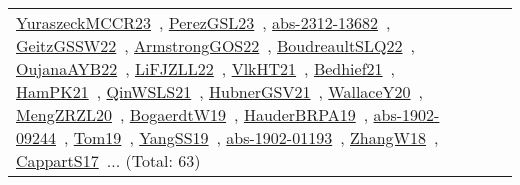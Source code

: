 {\begin{longtable}{lp{3cm}>{\raggedright\arraybackslash}p{6cm}>{\raggedright\arraybackslash}p{6cm}>{\raggedright\arraybackslash}p{8cm}}
\href{articles/YuraszeckMCCR23.pdf}{YuraszeckMCCR23}~\cite{YuraszeckMCCR23}, \href{papers/PerezGSL23.pdf}{PerezGSL23}~\cite{PerezGSL23}, \href{articles/abs-2312-13682.pdf}{abs-2312-13682}~\cite{abs-2312-13682}, \href{papers/GeitzGSSW22.pdf}{GeitzGSSW22}~\cite{GeitzGSSW22}, \href{papers/ArmstrongGOS22.pdf}{ArmstrongGOS22}~\cite{ArmstrongGOS22}, \href{papers/BoudreaultSLQ22.pdf}{BoudreaultSLQ22}~\cite{BoudreaultSLQ22}, \href{papers/OujanaAYB22.pdf}{OujanaAYB22}~\cite{OujanaAYB22}, \href{papers/LiFJZLL22.pdf}{LiFJZLL22}~\cite{LiFJZLL22}, \href{articles/VlkHT21.pdf}{VlkHT21}~\cite{VlkHT21}, \href{articles/Bedhief21.pdf}{Bedhief21}~\cite{Bedhief21}, \href{articles/HamPK21.pdf}{HamPK21}~\cite{HamPK21}, \href{articles/QinWSLS21.pdf}{QinWSLS21}~\cite{QinWSLS21}, \href{articles/HubnerGSV21.pdf}{HubnerGSV21}~\cite{HubnerGSV21}, \href{articles/WallaceY20.pdf}{WallaceY20}~\cite{WallaceY20}, \href{articles/MengZRZL20.pdf}{MengZRZL20}~\cite{MengZRZL20}, \href{papers/BogaerdtW19.pdf}{BogaerdtW19}~\cite{BogaerdtW19}, \href{articles/HauderBRPA19.pdf}{HauderBRPA19}~\cite{HauderBRPA19}, \href{articles/abs-1902-09244.pdf}{abs-1902-09244}~\cite{abs-1902-09244}, \href{papers/Tom19.pdf}{Tom19}~\cite{Tom19}, \href{papers/YangSS19.pdf}{YangSS19}~\cite{YangSS19}, \href{articles/abs-1902-01193.pdf}{abs-1902-01193}~\cite{abs-1902-01193}, \href{articles/ZhangW18.pdf}{ZhangW18}~\cite{ZhangW18}, \href{papers/CappartS17.pdf}{CappartS17}~\cite{CappartS17}... (Total: 63)\\

\end{longtable}}
